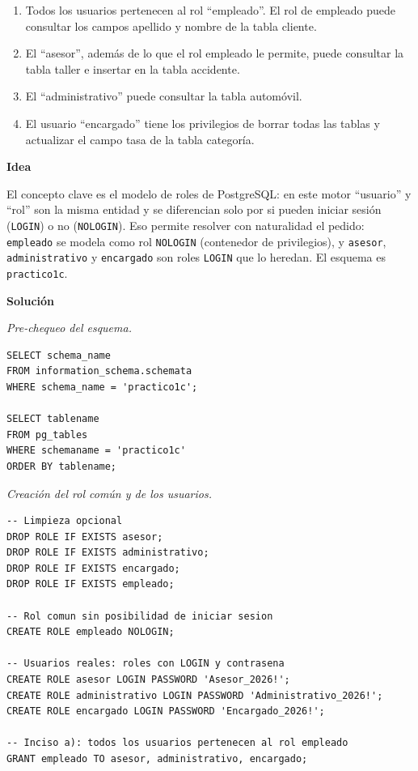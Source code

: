 \documentclass[11pt,a4paper]{article}
\newcommand{\itemcabecera}[1]{\noindent\textbf{#1}\par\medskip}
\newcommand{\bloqueIdea}{\itemcabecera{Idea}}
\newcommand{\bloqueSolucion}{\itemcabecera{Soluci\'on}}
\begin{document}
\begin{enumerate}[label=\alph*),leftmargin=*]
    \item Todos los usuarios pertenecen al rol ``empleado''. El rol de empleado puede consultar los campos apellido y nombre de la tabla cliente.
    \item El ``asesor'', además de lo que el rol empleado le permite, puede consultar la tabla taller e insertar en la tabla accidente.
    \item El ``administrativo'' puede consultar la tabla automóvil.
    \item El usuario ``encargado'' tiene los privilegios de borrar todas las tablas y actualizar el campo tasa de la tabla categoría.
\end{enumerate}

\bloqueIdea

El concepto clave es el modelo de roles de PostgreSQL: en este motor ``usuario'' y ``rol'' son la misma entidad y se diferencian solo por si pueden iniciar sesión (\texttt{LOGIN}) o no (\texttt{NOLOGIN}). Eso permite resolver con naturalidad el pedido: \texttt{empleado} se modela como rol \texttt{NOLOGIN} (contenedor de privilegios), y \texttt{asesor}, \texttt{administrativo} y \texttt{encargado} son roles \texttt{LOGIN} que lo heredan. El esquema es \texttt{practico1c}.

\bloqueSolucion

\textit{Pre-chequeo del esquema.}

\begin{lstlisting}
SELECT schema_name
FROM information_schema.schemata
WHERE schema_name = 'practico1c';

SELECT tablename
FROM pg_tables
WHERE schemaname = 'practico1c'
ORDER BY tablename;
\end{lstlisting}

\textit{Creación del rol común y de los usuarios.}

\begin{lstlisting}
-- Limpieza opcional
DROP ROLE IF EXISTS asesor;
DROP ROLE IF EXISTS administrativo;
DROP ROLE IF EXISTS encargado;
DROP ROLE IF EXISTS empleado;

-- Rol comun sin posibilidad de iniciar sesion
CREATE ROLE empleado NOLOGIN;

-- Usuarios reales: roles con LOGIN y contrasena
CREATE ROLE asesor LOGIN PASSWORD 'Asesor_2026!';
CREATE ROLE administrativo LOGIN PASSWORD 'Administrativo_2026!';
CREATE ROLE encargado LOGIN PASSWORD 'Encargado_2026!';

-- Inciso a): todos los usuarios pertenecen al rol empleado
GRANT empleado TO asesor, administrativo, encargado;
\end{lstlisting}
\end{document}
